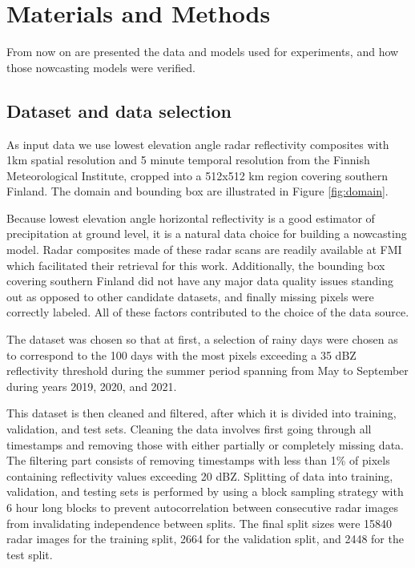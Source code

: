 \chapter{Materials and Methods}
\label{chapter:methods}

From now on are presented the data and models used for experiments, and how those nowcasting models were verified. 

\section{Dataset and data selection}
\label{section:data}

As input data we use lowest elevation angle radar reflectivity composites with 1km spatial resolution and 5 minute temporal resolution from the Finnish Meteorological Institute, cropped into a 512x512 km region covering southern Finland. The domain and bounding box are illustrated in Figure \ref{fig:domain}.

Because lowest elevation angle horizontal reflectivity is a good estimator of precipitation at ground level, it is a natural data choice for building a nowcasting model. Radar composites made of these radar scans are readily available at FMI which facilitated their retrieval for this work. Additionally, the bounding box covering southern Finland did not have any major data quality issues standing out as opposed to other candidate datasets, and finally missing pixels were correctly labeled. All of these factors contributed to the choice of the data source. 


The dataset was chosen so that at first, a selection of rainy days were chosen as to correspond to the 100 days with the most pixels exceeding a 35 dBZ reflectivity threshold during the summer period spanning from May to September during years 2019, 2020, and 2021. 

This dataset is then cleaned and filtered, after which it is divided into training, validation, and test sets. Cleaning the data involves first going through all timestamps and removing those with either partially or completely missing data. The filtering part consists of removing timestamps with less than 1\% of pixels containing reflectivity values exceeding 20 dBZ. Splitting of data into training, validation, and testing sets is performed by using a block sampling strategy \cite{schultz_can_2021} with 6 hour long blocks to prevent autocorrelation between consecutive radar images from invalidating independence between splits. The final split sizes were 15840 radar images for the training split, 2664 for the validation split, and 2448 for the test split. 

